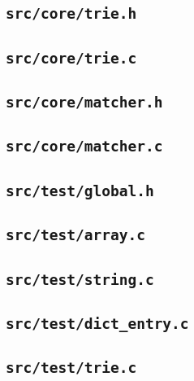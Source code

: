 \documentclass[../main.tex]{subfiles}
\begin{document}
\subsection{\texttt{src/core/trie.h}}


\subsection{\texttt{src/core/trie.c}}


\subsection{\texttt{src/core/matcher.h}}


\subsection{\texttt{src/core/matcher.c}}


\subsection{\texttt{src/test/global.h}}


\subsection{\texttt{src/test/array.c}}


\subsection{\texttt{src/test/string.c}}


\subsection{\texttt{src/test/dict\_entry.c}}


\subsection{\texttt{src/test/trie.c}}

\end{document}
